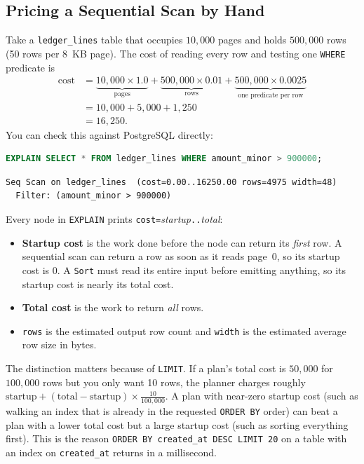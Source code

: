 \subsection{Pricing a Sequential Scan by Hand}

Take a \texttt{ledger\_lines} table that occupies $10{,}000$ pages and holds $500{,}000$ rows (50 rows per 8~KB page). The cost of reading every row and testing one \texttt{WHERE} predicate is
\begin{align*}
  \text{cost} &= \underbrace{10{,}000 \times 1.0}_{\text{pages}} + \underbrace{500{,}000 \times 0.01}_{\text{rows}} + \underbrace{500{,}000 \times 0.0025}_{\text{one predicate per row}} \\
  &= 10{,}000 + 5{,}000 + 1{,}250 \\
  &= 16{,}250.
\end{align*}
You can check this against PostgreSQL directly:

\begin{lstlisting}[language=SQL]
EXPLAIN SELECT * FROM ledger_lines WHERE amount_minor > 900000;
\end{lstlisting}
\begin{lstlisting}[language=Plain]
Seq Scan on ledger_lines  (cost=0.00..16250.00 rows=4975 width=48)
  Filter: (amount_minor > 900000)
\end{lstlisting}

Every node in \texttt{EXPLAIN} prints \texttt{cost=}\emph{startup}\texttt{..}\emph{total}:
\begin{itemize}
  \item \textbf{Startup cost} is the work done before the node can return its \emph{first} row. A sequential scan can return a row as soon as it reads page~0, so its startup cost is $0$. A \texttt{Sort} must read its entire input before emitting anything, so its startup cost is nearly its total cost.
  \item \textbf{Total cost} is the work to return \emph{all} rows.
  \item \texttt{rows} is the estimated output row count and \texttt{width} is the estimated average row size in bytes.
\end{itemize}

The distinction matters because of \texttt{LIMIT}. If a plan's total cost is $50{,}000$ for $100{,}000$ rows but you only want 10 rows, the planner charges roughly $\text{startup} + (\text{total} - \text{startup}) \times \tfrac{10}{100{,}000}$. A plan with near-zero startup cost (such as walking an index that is already in the requested \texttt{ORDER BY} order) can beat a plan with a lower total cost but a large startup cost (such as sorting everything first). This is the reason \texttt{ORDER BY created\_at DESC LIMIT 20} on a table with an index on \texttt{created\_at} returns in a millisecond.

